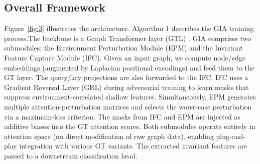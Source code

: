 \documentclass[a4paper,fleqn]{cas-dc}
\begin{document}
\subsection{Overall Framework}
Figure~\ref{fig:3} illustrates the architecture. {\color{blue}Algorithm 1 describes the GIA training process.}The backbone is a Graph Transformer layer (GTL) \cite{dwivedi2021generalization}. GIA comprises two submodules: the Environment Perturbation Module (EPM) and the Invariant Feature Capture Module (IFC). Given an input graph, we compute node/edge embeddings (augmented by Laplacian positional encodings) and feed them to the GT layer. The query/key projections are also forwarded to the IFC. IFC uses a Gradient Reversal Layer (GRL) during adversarial training to learn masks that suppress environment-correlated shallow features. Simultaneously, EPM generates multiple attention-perturbation matrices and selects the worst-case perturbation via a maximum-loss criterion. The masks from IFC and EPM are injected as additive biases into the GT attention scores. Both submodules operate entirely in attention space (no direct modification of raw graph data), enabling plug-and-play integration with various GT variants. The extracted invariant features are passed to a downstream classification head.
\end{document}
